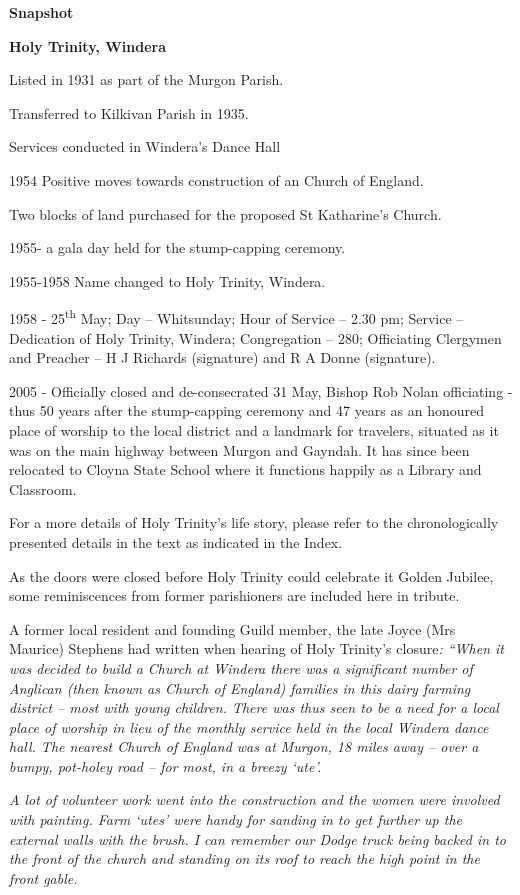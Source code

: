 \textbf{Snapshot}

\textbf{Holy Trinity, Windera}

Listed in 1931 as part of the Murgon Parish.

Transferred to Kilkivan Parish in 1935.

Services conducted in Windera's Dance Hall

1954 Positive moves towards construction of an Church of England.

Two blocks of land purchased for the proposed St Katharine's Church.

1955- a gala day held for the stump-capping ceremony.

1955-1958 Name changed to Holy Trinity, Windera.

1958 - 25\textsuperscript{th} May; Day -- Whitsunday; Hour of Service -- 2.30 pm; Service -- Dedication of Holy Trinity, Windera; Congregation -- 280; Officiating Clergymen and Preacher -- H J Richards (signature) and R A Donne (signature).

2005 - Officially closed and de-consecrated 31 May, Bishop Rob Nolan officiating - thus 50 years after the stump-capping ceremony and 47 years as an honoured place of worship to the local district and a landmark for travelers, situated as it was on the main highway between Murgon and Gayndah. It has since been relocated to Cloyna State School where it functions happily as a Library and Classroom.

For a more details of Holy Trinity's life story, please refer to the chronologically presented details in the text as indicated in the Index.

As the doors were closed before Holy Trinity could celebrate it Golden Jubilee, some reminiscences from former parishioners are included here in tribute.

A former local resident and founding Guild member, the late Joyce (Mrs Maurice) Stephens had written when hearing of Holy Trinity's closure\emph{: ``When it was decided to build a Church at Windera there was a significant number of Anglican (then known as Church of England) families in this dairy farming district -- most with young children. There was thus seen to be a need for a local place of worship in lieu of the monthly service held in the local Windera dance hall. The nearest Church of England was at Murgon, 18 miles away -- over a bumpy, pot-holey road -- for most, in a breezy `ute'.}

\emph{A lot of volunteer work went into the construction and the women were involved with painting. Farm `utes' were handy for sanding in to get further up the external walls with the brush. I can remember our Dodge truck being backed in to the front of the church and standing on its roof to reach the high point in the front gable.}

